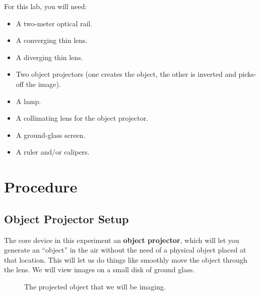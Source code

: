 \documentclass[]{manual}
\begin{document}
    For this lab, you will need:
    \begin{itemize}
        \item A two-meter optical rail.
        \item A converging thin lens.
        \item A diverging thin lens.
        \item Two object projectors (one creates the object, the other is inverted and picks-off the image).
        \item A lamp.
        \item A collimating lens for the object projector.
        \item A ground-glass screen.
        \item A ruler and/or calipers.
    \end{itemize}


    \FloatBarrier
    \newpage

    \section*{Procedure}

    \subsection{Object Projector Setup}

    The core device in this experiment an \textbf{object projector}, which will let you generate an ``object'' in the air without the need of a physical object placed at that location.
    This will let us do things like smoothly move the object through the lens.
    We will view images on a small disk of ground glass.

    \begin{figure}
        \centering


        \caption{
            The projected object that we will be imaging.
        }

        \label{fig:projected-object}
    \end{figure}
\end{document}
